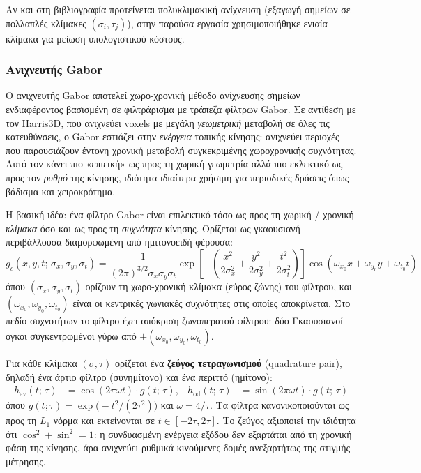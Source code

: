 \documentclass[12pt, a4paper]{article}
\begin{document}
Αν και στη βιβλιογραφία \cite{laptev2008} προτείνεται πολυκλιμακική ανίχνευση (εξαγωγή σημείων σε πολλαπλές κλίμακες $(\sigma_i,\tau_j)$), στην παρούσα εργασία χρησιμοποιήθηκε ενιαία κλίμακα για μείωση υπολογιστικού κόστους.

\subsubsection{Ανιχνευτής Gabor}

Ο ανιχνευτής Gabor αποτελεί χωρο-χρονική μέθοδο ανίχνευσης σημείων ενδιαφέροντος
βασισμένη σε φιλτράρισμα με τράπεζα φίλτρων Gabor. Σε αντίθεση με τον Harris3D, που
ανιχνεύει voxels με μεγάλη \emph{γεωμετρική} μεταβολή σε όλες τις κατευθύνσεις, ο
Gabor εστιάζει στην \emph{ενέργεια} τοπικής κίνησης: ανιχνεύει περιοχές που
παρουσιάζουν έντονη χρονική μεταβολή συγκεκριμένης χωροχρονικής συχνότητας. Αυτό τον κάνει
πιο «επιεική» ως προς τη χωρική γεωμετρία αλλά πιο εκλεκτικό ως προς τον
\emph{ρυθμό} της κίνησης, ιδιότητα ιδιαίτερα χρήσιμη για περιοδικές δράσεις
όπως βάδισμα και χειροκρότημα.

Η βασική ιδέα: ένα φίλτρο Gabor είναι επιλεκτικό τόσο ως προς τη χωρική / χρονική
\emph{κλίμακα} όσο και ως προς τη \emph{συχνότητα} κίνησης. Ορίζεται ως γκαουσιανή
περιβάλλουσα διαμορφωμένη από ημιτονοειδή φέρουσα:
\begin{equation}
    g_c(x,y,t;\,\sigma_x,\sigma_y,\sigma_t) =
    \frac{1}{(2\pi)^{3/2}\sigma_x\sigma_y\sigma_t}
    \exp\!\left[-\left(\frac{x^2}{2\sigma_x^2}+\frac{y^2}{2\sigma_y^2}+\frac{t^2}{2\sigma_t^2}\right)\right]
    \cos(\omega_{x_0}x + \omega_{y_0}y + \omega_{t_0}t)
\end{equation}
όπου $(\sigma_x,\sigma_y,\sigma_t)$ ορίζουν τη χωρο-χρονική κλίμακα (εύρος ζώνης) του
φίλτρου, και $(\omega_{x_0},\omega_{y_0},\omega_{t_0})$ είναι οι κεντρικές γωνιακές
συχνότητες στις οποίες αποκρίνεται. Στο πεδίο συχνοτήτων το φίλτρο έχει απόκριση
ζωνοπερατού φίλτρου: δύο Γκαουσιανοί όγκοι συγκεντρωμένοι γύρω από $\pm(\omega_{x_0},\omega_{y_0},\omega_{t_0})$.

Για κάθε κλίμακα $(\sigma, \tau)$ ορίζεται ένα \textbf{ζεύγος τετραγωνισμού}
(quadrature pair), δηλαδή ένα άρτιο φίλτρο (συνημίτονο) και ένα περιττό (ημίτονο):
\begin{align}
    h_{\text{ev}}(t;\,\tau) &= \cos(2\pi \omega t)\cdot g(t;\,\tau), &
    h_{\text{od}}(t;\,\tau) &= \sin(2\pi \omega t)\cdot g(t;\,\tau)
\end{align}
όπου $g(t;\tau) = \exp\!\bigl(-t^2/(2\tau^2)\bigr)$ και $\omega = 4/\tau$.
Τα φίλτρα κανονικοποιούνται ως προς τη $L_1$ νόρμα και εκτείνονται σε
$t \in [-2\tau, 2\tau]$. Το ζεύγος αξιοποιεί την ιδιότητα ότι $\cos^2\!+\sin^2\!=1$:
η συνδυασμένη ενέργεια εξόδου δεν εξαρτάται από τη χρονική φάση της κίνησης, άρα
ανιχνεύει ρυθμικά κινούμενες δομές ανεξαρτήτως της στιγμής μέτρησης.
\end{document}
